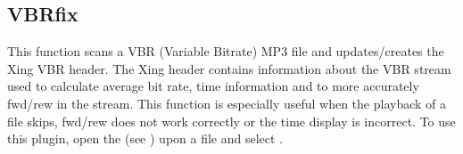 \subsection{VBRfix}
This function scans a VBR (Variable Bitrate)
MP3 file and updates/creates the Xing VBR header. The Xing header
contains information about the VBR stream used to calculate average bit
rate, time information and to more accurately fwd/rew in the stream.
This function is especially useful when the playback of a file skips,
fwd/rew does not work correctly or the time display is incorrect.
To use this plugin, open the  (see )
upon a  file and select .
\par
{}

